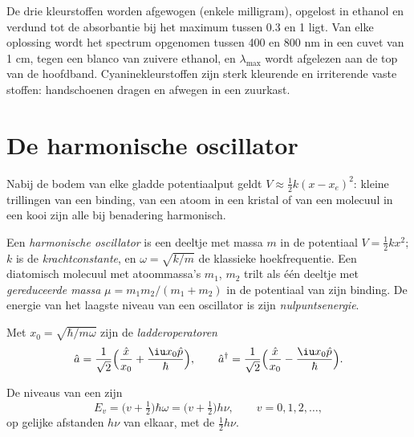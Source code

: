 \begin{inthelab}
De drie kleurstoffen worden afgewogen (enkele milligram), opgelost in
ethanol en verdund tot de absorbantie bij het maximum tussen 0.3 en 1
ligt. Van elke oplossing wordt het spectrum opgenomen tussen 400 en
800 nm in een cuvet van 1 cm, tegen een blanco van zuivere ethanol, en
$\lambda_{\max}$ wordt afgelezen aan de top van de hoofdband.
Cyaninekleurstoffen zijn sterk kleurende en irriterende vaste stoffen:
handschoenen dragen en afwegen in een zuurkast.
\end{inthelab}

\section{De harmonische oscillator}

Nabij de bodem van elke gladde potentiaalput geldt $V \approx \frac12 k(x - x_e)^2$:
kleine trillingen van een binding, van een atoom in een kristal of van een
molecuul in een kooi zijn alle bij benadering harmonisch.

\begin{definition}\label{def:b3:quantum-model-systems:oscillator}
Een \emph{harmonische oscillator} is een
deeltje met massa $m$ in de potentiaal $V = \frac12 kx^2$; $k$ is de
\emph{krachtconstante}, en $\omega = \sqrt{k/m}$ de
klassieke hoekfrequentie. Een diatomisch molecuul met atoommassa's $m_1$, $m_2$
trilt als één deeltje met \emph{gereduceerde massa}
$\mu = m_1m_2/(m_1 + m_2)$ in de potentiaal van zijn binding. De energie van
het laagste niveau van een oscillator is zijn
\emph{nulpuntsenergie}.
\end{definition}

\begin{definition}[Ladderoperatoren]\label{def:b3:quantum-model-systems:ladder}
Met $x_0 = \sqrt{\hbar/m\omega}$ zijn de
\emph{ladderoperatoren}
\[
\hat a = \frac{1}{\sqrt2}\Big(\frac{\hat x}{x_0} + \frac{\iu x_0\hat p}{\hbar}\Big),
\qquad \hat a^\dagger = \frac{1}{\sqrt2}\Big(\frac{\hat x}{x_0} -
\frac{\iu x_0\hat p}{\hbar}\Big).
\]
\end{definition}

\begin{theorem}\label{thm:b3:quantum-model-systems:oscillator}
De niveaus van een  zijn
\[
E_v = \big(v + \tfrac12\big)\hbar\omega = \big(v + \tfrac12\big)h\nu, \qquad v =
0, 1, 2, \dots,
\]
op gelijke afstanden $h\nu$ van elkaar, met de  $\frac12h\nu$.
\end{theorem}

